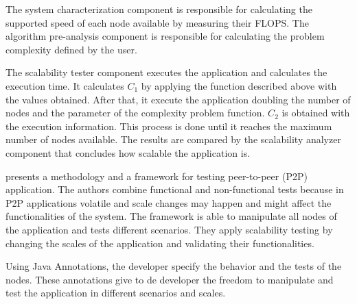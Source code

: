 The system characterization component is responsible for calculating the supported speed of each node available by measuring their FLOPS. The algorithm pre-analysis component is responsible for calculating the problem complexity defined by the user. 

The scalability tester component executes the application and calculates the execution time.  It calculates $C_1$ by applying the function described above with the values obtained. After that, it execute the application doubling the number of nodes and the parameter of the complexity problem function. $C_2$ is obtained with the execution information. This process is done until it reaches the maximum number of nodes available. The results are compared by the scalability analyzer component that concludes how scalable the application is.

\cite{p2p} presents a methodology and a framework for testing peer-to-peer (P2P) application. The authors combine functional and non-functional tests because in P2P applications volatile and scale changes may happen and might affect the functionalities of the system. The framework is able to manipulate all nodes of the application and tests different scenarios. They apply scalability testing by changing the scales of the application and validating their functionalities. 

Using Java Annotations, the developer specify the behavior and the tests of the nodes. These annotations give to de developer the freedom to manipulate and test the application in different scenarios and scales.










